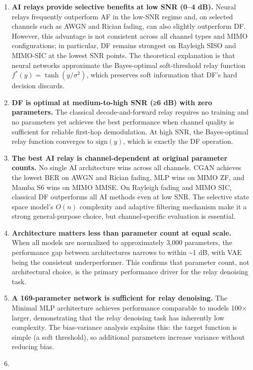\begin{enumerate}
\def\labelenumi{\arabic{enumi}.}
\item
  \textbf{AI relays provide selective benefits at low SNR (0--4 dB).} Neural relays frequently outperform AF in the low-SNR regime and, on selected channels such as AWGN and Rician fading, can also slightly outperform DF. However, this advantage is not consistent across all channel types and MIMO configurations; in particular, DF remains strongest on Rayleigh SISO and MIMO-SIC at the lowest SNR points. The theoretical explanation is that neural networks approximate the Bayes-optimal soft-threshold relay function \(f^*(y) = \tanh(y/\sigma^2)\), which preserves soft information that DF's hard decision discards.
\item
  \textbf{DF is optimal at medium-to-high SNR (≥6 dB) with zero parameters.} The classical decode-and-forward relay requires no training and no parameters yet achieves the best performance when channel quality is sufficient for reliable first-hop demodulation. At high SNR, the Bayes-optimal relay function converges to \(\text{sign}(y)\), which is exactly the DF operation.
\item
  \textbf{The best AI relay is channel-dependent at original parameter counts.} No single AI architecture wins across all channels. CGAN achieves the lowest BER on AWGN and Rician fading, MLP wins on MIMO ZF, and Mamba S6 wins on MIMO MMSE. On Rayleigh fading and MIMO SIC, classical DF outperforms all AI methods even at low SNR. The selective state space model's \(O(n)\) complexity and adaptive filtering mechanism make it a strong general-purpose choice, but channel-specific evaluation is essential.
\item
  \textbf{Architecture matters less than parameter count at equal scale.} When all models are normalized to approximately 3,000 parameters, the performance gap between architectures narrows to within \textasciitilde1 dB, with VAE being the consistent underperformer. This confirms that parameter count, not architectural choice, is the primary performance driver for the relay denoising task.
\item
  \textbf{A 169-parameter network is sufficient for relay denoising.} The Minimal MLP architecture achieves performance comparable to models 100× larger, demonstrating that the relay denoising task has inherently low complexity. The bias-variance analysis explains this: the target function is simple (a soft threshold), so additional parameters increase variance without reducing bias.
\item

\end{enumerate}

